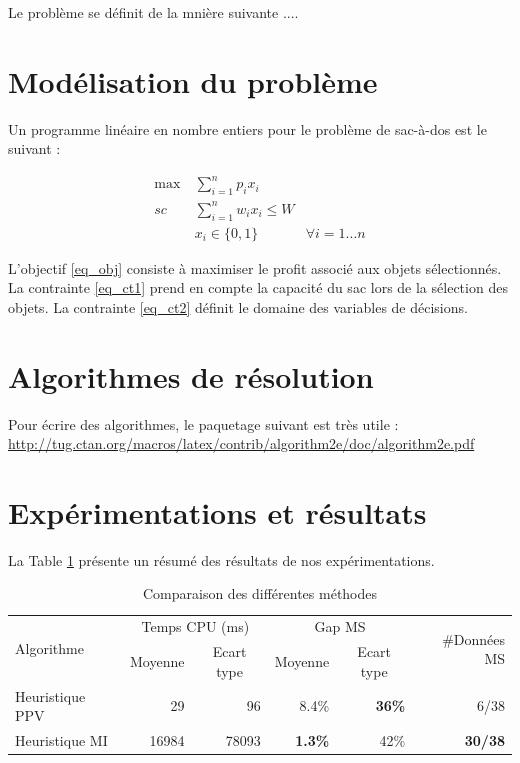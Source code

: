\documentclass[french,nochapter,11pt]{rapportUB}
\begin{document}
Le problème se définit de la mnière suivante ....

\section{Modélisation du problème}
\label{sec:modelisation}
Un programme linéaire en nombre entiers pour le problème de sac-à-dos est le suivant :

\begin{align}
\max~ &  \sum_{i=1}^{n}p_ix_i \label{eq_obj} \\
sc~ & \sum_{i=1}^{n}w_ix_i \leq W \label{eq_ct1} \\
& x_i \in \{0,1\} & \forall i=1...n \label{eq_ct2} 
\end{align}

L'objectif \eqref{eq_obj} consiste à maximiser le profit associé aux objets sélectionnés. 
La contrainte \eqref{eq_ct1} prend en compte la capacité du sac lors de la sélection des objets.
La contrainte \eqref{eq_ct2} définit le domaine des variables de décisions.


\section{Algorithmes de résolution}
\label{sec:algo}

Pour écrire des algorithmes, le paquetage suivant est très utile : \url{http://tug.ctan.org/macros/latex/contrib/algorithm2e/doc/algorithm2e.pdf}  


\section{Expérimentations et résultats}
\label{sec:exp}

La Table \ref{table:resultats} présente un résumé des résultats de nos expérimentations. 

\begin{table}[htbp]
  \centering
  \caption{Comparaison des différentes méthodes}
  \label{table:resultats}
    \begin{tabular}{l|rrrrr}
    \hline
    \multirow{2}[0]{*}{Algorithme}&  \multicolumn{2}{c}{Temps CPU (ms)}  & \multicolumn{2}{c}{Gap MS} &  \multirow{2}[0]{*}{\#Données MS}  \\
        & \multicolumn{1}{c}{Moyenne}   & \multicolumn{1}{c}{Ecart type} & \multicolumn{1}{c}{Moyenne} & \multicolumn{1}{c}{Ecart type} & \\
          \hline
    Heuristique PPV & 29 & 96 & 8.4\% & \textbf{36\%} &  6/38\\
    Heuristique MI & 16984 & 78093  & \textbf{1.3\%} & 42\% &   \textbf{30/38} \\
    \hline
    \end{tabular}%
\end{table}%
\end{document}
